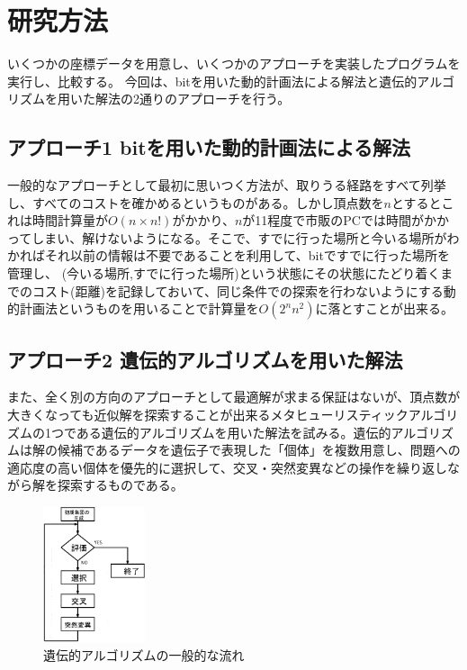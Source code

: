 \documentclass[a4paper, 11pt]{jsarticle}
\begin{document}
	\section{研究方法}

	いくつかの座標データを用意し、いくつかのアプローチを実装したプログラムを実行し、比較する。
	今回は、bitを用いた動的計画法による解法と遺伝的アルゴリズムを用いた解法の2通りのアプローチを行う。

	\subsection{アプローチ1 bitを用いた動的計画法による解法}

	一般的なアプローチとして最初に思いつく方法が、取りうる経路をすべて列挙し、すべてのコストを確かめるというものがある。しかし頂点数を$n$とするとこれは時間計算量が$O(n \times n!)$がかかり、$n$が11程度で市販のPCでは時間がかかってしまい、解けないようになる。そこで、すでに行った場所と今いる場所がわかればそれ以前の情報は不要であることを利用して、bitですでに行った場所を管理し、 (今いる場所,すでに行った場所)という状態にその状態にたどり着くまでのコスト(距離)を記録しておいて、同じ条件での探索を行わないようにする動的計画法というものを用いることで計算量を$O(2^n n^2)$に落とすことが出来る。

	\subsection{アプローチ2 遺伝的アルゴリズムを用いた解法}

	また、全く別の方向のアプローチとして最適解が求まる保証はないが、頂点数が大きくなっても近似解を探索することが出来るメタヒューリスティックアルゴリズムの1つである遺伝的アルゴリズムを用いた解法を試みる。遺伝的アルゴリズムは解の候補であるデータを遺伝子で表現した「個体」を複数用意し、問題への適応度の高い個体を優先的に選択して、交叉・突然変異などの操作を繰り返しながら解を探索するものである。
	\begin{figure}[htbp]
		\begin{center}
			\includegraphics[width=3cm,bb=0 0 172 228]{img/ga.png}
			\caption{遺伝的アルゴリズムの一般的な流れ}
			\label{genetic_algorithm}
		\end{center}
	\end{figure}
\end{document}
